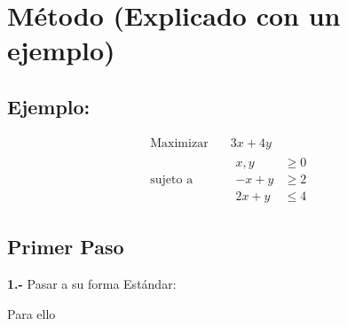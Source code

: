 \documentclass{article}
\begin{document}
\section{Método (Explicado con un ejemplo)}
  \subsection{Ejemplo:}
    \begin{equation*}
   \begin{aligned}
   \text{Maximizar} \quad & 3x+4y\\
   \text{sujeto a} \quad &
     \begin{aligned}
      x,y &\geq  0\\
      -x+y &\geq 2\\
     2x+y &\leq 4
     \end{aligned}
   \end{aligned}
 \end{equation*}
 \subsection{Primer Paso}
 \textbf{1.-} Pasar a su forma Estándar:

 Para ello 
 
 

 
\end{document}
